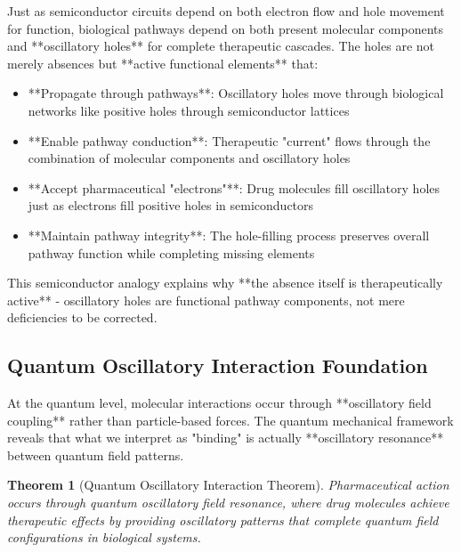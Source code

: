 \documentclass[12pt,a4paper]{article}
\newtheorem{theorem}{Theorem}[section]
\begin{document}
Just as semiconductor circuits depend on both electron flow and hole movement for function, biological pathways depend on both present molecular components and **oscillatory holes** for complete therapeutic cascades. The holes are not merely absences but **active functional elements** that:

\begin{itemize}
\item **Propagate through pathways**: Oscillatory holes move through biological networks like positive holes through semiconductor lattices
\item **Enable pathway conduction**: Therapeutic "current" flows through the combination of molecular components and oscillatory holes
\item **Accept pharmaceutical "electrons"**: Drug molecules fill oscillatory holes just as electrons fill positive holes in semiconductors
\item **Maintain pathway integrity**: The hole-filling process preserves overall pathway function while completing missing elements
\end{itemize}

This semiconductor analogy explains why **the absence itself is therapeutically active** - oscillatory holes are functional pathway components, not mere deficiencies to be corrected.

\subsection{Quantum Oscillatory Interaction Foundation}

At the quantum level, molecular interactions occur through **oscillatory field coupling** rather than particle-based forces. The quantum mechanical framework reveals that what we interpret as "binding" is actually **oscillatory resonance** between quantum field patterns.

\begin{theorem}[Quantum Oscillatory Interaction Theorem]
Pharmaceutical action occurs through quantum oscillatory field resonance, where drug molecules achieve therapeutic effects by providing oscillatory patterns that complete quantum field configurations in biological systems.
\end{theorem}
\end{document}
